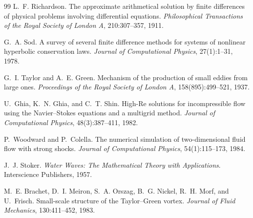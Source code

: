 \documentclass[11pt,a4paper]{article}
\begin{document}
\begin{thebibliography}{99}
L.~F. Richardson.
\newblock The approximate arithmetical solution by finite differences of physical problems involving differential equations.
\newblock \emph{Philosophical Transactions of the Royal Society of London A}, 210:307--357, 1911.

G.~A. Sod.
\newblock A survey of several finite difference methods for systems of nonlinear hyperbolic conservation laws.
\newblock \emph{Journal of Computational Physics}, 27(1):1--31, 1978.

G.~I. Taylor and A.~E. Green.
\newblock Mechanism of the production of small eddies from large ones.
\newblock \emph{Proceedings of the Royal Society of London A}, 158(895):499--521, 1937.

U.~Ghia, K.~N. Ghia, and C.~T. Shin.
\newblock High-{Re} solutions for incompressible flow using the {Navier--Stokes} equations and a multigrid method.
\newblock \emph{Journal of Computational Physics}, 48(3):387--411, 1982.

P.~Woodward and P.~Colella.
\newblock The numerical simulation of two-dimensional fluid flow with strong shocks.
\newblock \emph{Journal of Computational Physics}, 54(1):115--173, 1984.

J.~J. Stoker.
\newblock \emph{Water Waves: The Mathematical Theory with Applications}.
\newblock Interscience Publishers, 1957.

M.~E. Brachet, D.~I. Meiron, S.~A. Orszag, B.~G. Nickel, R.~H. Morf, and U.~Frisch.
\newblock Small-scale structure of the {Taylor--Green} vortex.
\newblock \emph{Journal of Fluid Mechanics}, 130:411--452, 1983.

\end{thebibliography}
\end{document}
